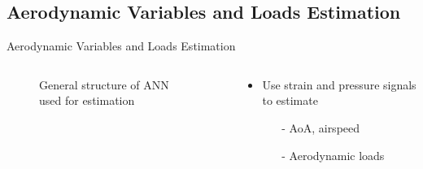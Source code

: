 \documentclass[aspectratio=169]{beamer}            %
\begin{document}
\subsection[Aerodynamic Variables and Loads Estimation]{Aerodynamic Variables and Loads Estimation}
\begin{frame}{Aerodynamic Variables and Loads Estimation}

  \vspace{-1.5em}
	\begin{columns}
	  \begin{column}{0.6\textwidth}
		  \begin{figure}[!htb]
        \centering
				
				\caption{General structure of ANN used for estimation}
				\label{fig:ANN_UAVCtrl_BlockDiagram}
      \end{figure}
		\end{column}
    \begin{column}{0.4\textwidth}
      \begin{itemize}[<+->]
        \item{Use strain and pressure signals to estimate}
			  \begin{itemize}[<+->]
			    \item[-]{AoA, airspeed}
          \item[-]{Aerodynamic loads}
			  \end{itemize}
      \end{itemize}
		\end{column}
	\end{columns}

\end{frame}
\end{document}
